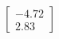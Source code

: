 \documentclass[preview]{standalone}
\begin{document}
\begin{align*}
\begin{bmatrix} -4.72 \\ 2.83 \end{bmatrix}
\end{align*}
\end{document}
